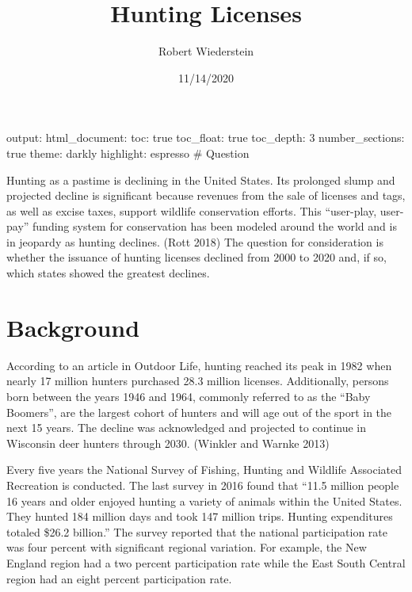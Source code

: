 \documentclass[]{tufte-handout}
\title{Hunting Licenses}
\author{Robert Wiederstein}
\date{11/14/2020}
\begin{document}
\maketitle




output: html\_document: toc: true toc\_float: true toc\_depth: 3
number\_sections: true theme: darkly highlight: espresso \# Question

Hunting as a pastime is declining in the United States. Its prolonged
slump and projected decline is significant because revenues from the
sale of licenses and tags, as well as excise taxes, support wildlife
conservation efforts. This ``user-play, user-pay'' funding system for
conservation has been modeled around the world and is in jeopardy as
hunting declines. (Rott 2018) The question for consideration is whether
the issuance of hunting licenses declined from 2000 to 2020 and, if so,
which states showed the greatest declines.

\hypertarget{background}{%
\section{Background}\label{background}}

According to an article in Outdoor Life, hunting reached its peak in
1982 when nearly 17 million hunters purchased 28.3 million licenses.
Additionally, persons born between the years 1946 and 1964, commonly
referred to as the ``Baby Boomers'', are the largest cohort of hunters
and will age out of the sport in the next 15 years. The decline was
acknowledged and projected to continue in Wisconsin deer hunters through
2030. (Winkler and Warnke 2013)

Every five years the National Survey of Fishing, Hunting and Wildlife
Associated Recreation is conducted. The last survey in 2016 found that
``11.5 million people 16 years and older enjoyed hunting a variety of
animals within the United States. They hunted 184 million days and took
147 million trips. Hunting expenditures totaled \$26.2 billion.'' The
survey reported that the national participation rate was four percent
with significant regional variation. For example, the New England region
had a two percent participation rate while the East South Central region
had an eight percent participation rate.
\end{document}
